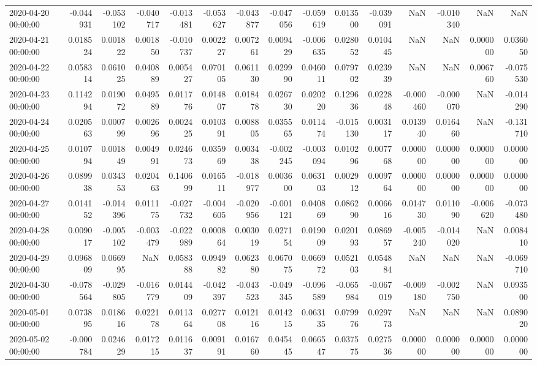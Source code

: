 \begin{tabular}{lrrrrrrrrrrrrrr}
2020-04-20 00:00:00 & -0.044931 & -0.053102 & -0.040717 & -0.013481 & -0.053627 & -0.043877 & -0.047056 & -0.059619 & 0.013500 & -0.039091 & NaN & -0.010340 & NaN & NaN \\
2020-04-21 00:00:00 & 0.018524 & 0.001822 & 0.001850 & -0.010737 & 0.002227 & 0.007261 & 0.009429 & -0.006635 & 0.028052 & 0.010445 & NaN & NaN & 0.000000 & 0.036050 \\
2020-04-22 00:00:00 & 0.058314 & 0.061025 & 0.040889 & 0.005427 & 0.070105 & 0.061130 & 0.029990 & 0.046011 & 0.079702 & 0.023939 & NaN & NaN & 0.006760 & -0.075530 \\
2020-04-23 00:00:00 & 0.114294 & 0.019072 & 0.049589 & 0.011776 & 0.014807 & 0.018478 & 0.026730 & 0.020220 & 0.129636 & 0.022848 & -0.000460 & -0.000070 & NaN & -0.014290 \\
2020-04-24 00:00:00 & 0.020563 & 0.000799 & 0.002696 & 0.002425 & 0.010391 & 0.008805 & 0.035565 & 0.011474 & -0.015130 & 0.003117 & 0.013940 & 0.016460 & NaN & -0.131710 \\
2020-04-25 00:00:00 & 0.010794 & 0.001849 & 0.004991 & 0.024673 & 0.035969 & 0.003438 & -0.002245 & -0.003094 & 0.010296 & 0.007768 & 0.000000 & 0.000000 & 0.000000 & 0.000000 \\
2020-04-26 00:00:00 & 0.089938 & 0.034353 & 0.020463 & 0.140699 & 0.016511 & -0.018977 & 0.003600 & 0.063103 & 0.002912 & 0.009764 & 0.000000 & 0.000000 & 0.000000 & 0.000000 \\
2020-04-27 00:00:00 & 0.014152 & -0.014396 & 0.011175 & -0.027732 & -0.004605 & -0.020956 & -0.001121 & 0.040869 & 0.086290 & 0.006616 & 0.014730 & 0.011090 & -0.006620 & -0.073480 \\
2020-04-28 00:00:00 & 0.009017 & -0.005102 & -0.003479 & -0.022989 & 0.000864 & 0.003019 & 0.027154 & 0.019009 & 0.020193 & 0.086957 & -0.005240 & -0.014020 & NaN & 0.008410 \\
2020-04-29 00:00:00 & 0.096809 & 0.066995 & NaN & 0.058388 & 0.094982 & 0.062380 & 0.067075 & 0.066972 & 0.052103 & 0.054884 & NaN & NaN & NaN & -0.069710 \\
2020-04-30 00:00:00 & -0.078564 & -0.029805 & -0.016779 & 0.014409 & -0.042397 & -0.043523 & -0.049345 & -0.096589 & -0.065984 & -0.067019 & -0.009180 & -0.002750 & NaN & 0.093500 \\
2020-05-01 00:00:00 & 0.073895 & 0.018616 & 0.022178 & 0.011364 & 0.027708 & 0.012116 & 0.014215 & 0.063135 & 0.079976 & 0.029773 & NaN & NaN & NaN & 0.089020 \\
2020-05-02 00:00:00 & -0.000784 & 0.024629 & 0.017215 & 0.011637 & 0.009191 & 0.016760 & 0.045445 & 0.066547 & 0.037575 & 0.027536 & 0.000000 & 0.000000 & 0.000000 & 0.000000 \\

\end{tabular}
